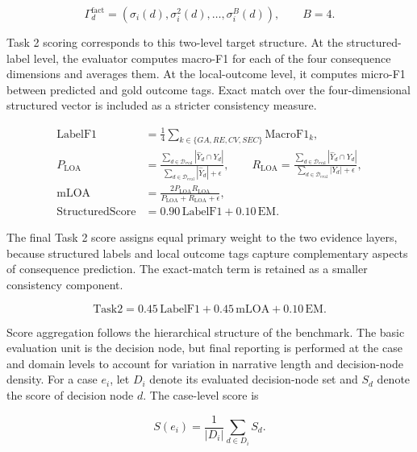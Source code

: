 \documentclass[pdflatex,sn-mathphys-num]{sn-jnl}%
\theoremstyle{thmstyleone}%
\theoremstyle{thmstyletwo}%
\theoremstyle{thmstylethree}%
\begin{document}
\begin{equation}
\Gamma_d^{\mathrm{fact}}=(\sigma_i(d),\sigma_i^2(d),\ldots,\sigma_i^{B}(d)),\qquad B=4.
\end{equation}

Task 2 scoring corresponds to this two-level target structure. At the structured-label level, the evaluator computes macro-F1 for each of the four consequence dimensions and averages them. At the local-outcome level, it computes micro-F1 between predicted and gold outcome tags. Exact match over the four-dimensional structured vector is included as a stricter consistency measure.

\begin{align}
\mathrm{LabelF1}&=\frac{1}{4}\sum_{k\in\{GA,RE,CV,SEC\}}\mathrm{MacroF1}_k,\\
P_{\mathrm{LOA}}&=\frac{\sum_{d\in\mathcal{D}_{\mathrm{eval}}} |\hat{Y}_d\cap Y_d|}{\sum_{d\in\mathcal{D}_{\mathrm{eval}}} |\hat{Y}_d|+\epsilon},\qquad
R_{\mathrm{LOA}}=\frac{\sum_{d\in\mathcal{D}_{\mathrm{eval}}} |\hat{Y}_d\cap Y_d|}{\sum_{d\in\mathcal{D}_{\mathrm{eval}}} |Y_d|+\epsilon},\\
\mathrm{mLOA}&=\frac{2P_{\mathrm{LOA}}R_{\mathrm{LOA}}}{P_{\mathrm{LOA}}+R_{\mathrm{LOA}}+\epsilon},\\
\mathrm{StructuredScore}&=0.90\,\mathrm{LabelF1}+0.10\,\mathrm{EM}.
\end{align}

The final Task 2 score assigns equal primary weight to the two evidence layers, because structured labels and local outcome tags capture complementary aspects of consequence prediction. The exact-match term is retained as a smaller consistency component.

\begin{equation}
\mathrm{Task2}=0.45\,\mathrm{LabelF1}+0.45\,\mathrm{mLOA}+0.10\,\mathrm{EM}.
\end{equation}

Score aggregation follows the hierarchical structure of the benchmark. The basic evaluation unit is the decision node, but final reporting is performed at the case and domain levels to account for variation in narrative length and decision-node density. For a case $e_i$, let $D_i$ denote its evaluated decision-node set and $S_d$ denote the score of decision node $d$. The case-level score is

\begin{equation}
S(e_i)=\frac{1}{|D_i|}\sum_{d\in D_i}S_d.
\end{equation}
\end{document}
